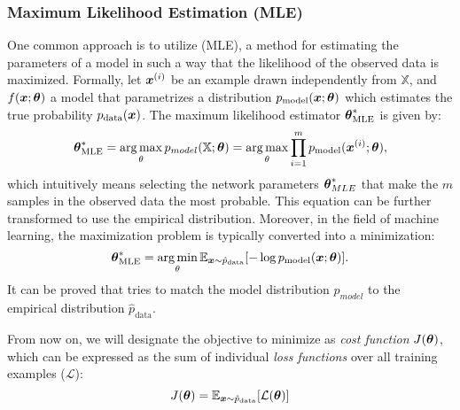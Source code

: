 \subsubsection{Maximum Likelihood Estimation (MLE)}\label{subsubsec:mle}
One common approach is to utilize  (MLE), a method for estimating the parameters of a model in such a way that the likelihood of the observed data is maximized. Formally, let $\boldsymbol{x}^{(i)}$ be an example drawn independently from $\mathbb{X}$, and $f(\boldsymbol{x};\boldsymbol{\theta})$ a model that parametrizes a distribution $p_{\text{model}}(\boldsymbol{x};\boldsymbol{\theta})$ which estimates the true probability $p_{\text{data}}(\boldsymbol{x})$. The maximum likelihood estimator $\boldsymbol{\theta}^*_{\text{MLE}}$ is given by:
\begin{equation}
    \boldsymbol{\theta}^*_{\text{MLE}} = \operatorname*{arg\,max}_\theta p_{model}(\mathbb{X};\boldsymbol{\theta}) = \operatorname*{arg\,max}_\theta \prod_{i=1}^m p_{\text{model}}(\boldsymbol{x}^{(i)};\boldsymbol{\theta}),
\end{equation}
which intuitively means selecting the network parameters $\boldsymbol{\theta}^*_{MLE}$ that make the $m$ samples in the observed data the most probable. This equation can be further transformed to use the empirical distribution. Moreover, in the field of machine learning, the maximization problem is typically converted into a minimization:
\begin{equation}
    \boldsymbol{\theta}^*_{\text{MLE}} = \operatorname*{arg\,min}_\theta \mathbb{E}_{\boldsymbol{x}\sim \hat{p}_{\text{data}}} [- \log p_{\text{model}}(\boldsymbol{x};\boldsymbol{\theta})].
    \label{eq:mle}
\end{equation}
It can be proved that  tries to match the model distribution $p_{model}$ to the empirical distribution $\hat{p}_{\text{data}}$. 

From now on, we will designate the objective to minimize as \textit{cost function} $J(\boldsymbol{\theta})$, which can be expressed as the sum of individual \textit{loss functions} over all training examples ($\mathcal{L}$):
\begin{equation}
    J(\boldsymbol{\theta}) = \mathbb{E}_{\boldsymbol{x}\sim \hat{p}_{\text{data}}} [\mathcal{L}(\boldsymbol{\theta})]
    \label{eq:cost_exp}
\end{equation}


